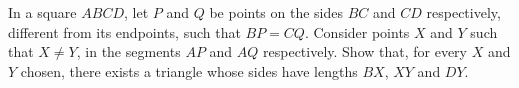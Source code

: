 In a square $ABCD$,  let $P$ and $Q$ be points on the sides $BC$ and $CD$ respectively, different from its endpoints, such that $BP=CQ$. Consider points $X$ and $Y$ such that $X\neq Y$,  in the segments $AP$ and $AQ$ respectively. Show that, for every $X$ and $Y$ chosen, there exists a triangle whose sides have lengths $BX$,  $XY$ and $DY$.